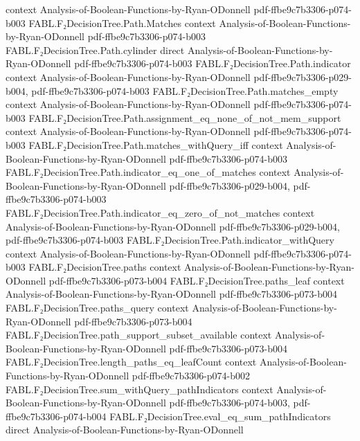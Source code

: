 \begin{theorem}
  {context}
  {Analysis-of-Boolean-Functions-by-Ryan-ODonnell}
  {pdf-ffbe9c7b3306-p074-b003}
\proofstep
  {FABL.F₂DecisionTree.Path.Matches}
  {context}
  {Analysis-of-Boolean-Functions-by-Ryan-ODonnell}
  {pdf-ffbe9c7b3306-p074-b003}
\proofstep
  {FABL.F₂DecisionTree.Path.cylinder}
  {direct}
  {Analysis-of-Boolean-Functions-by-Ryan-ODonnell}
  {pdf-ffbe9c7b3306-p074-b003}
\proofstep
  {FABL.F₂DecisionTree.Path.indicator}
  {context}
  {Analysis-of-Boolean-Functions-by-Ryan-ODonnell}
  {pdf-ffbe9c7b3306-p029-b004,
    pdf-ffbe9c7b3306-p074-b003}
\proofstep
  {FABL.F₂DecisionTree.Path.matches_empty}
  {context}
  {Analysis-of-Boolean-Functions-by-Ryan-ODonnell}
  {pdf-ffbe9c7b3306-p074-b003}
\proofstep
  {FABL.F₂DecisionTree.Path.assignment_eq_none_of_not_mem_support}
  {context}
  {Analysis-of-Boolean-Functions-by-Ryan-ODonnell}
  {pdf-ffbe9c7b3306-p074-b003}
\proofstep
  {FABL.F₂DecisionTree.Path.matches_withQuery_iff}
  {context}
  {Analysis-of-Boolean-Functions-by-Ryan-ODonnell}
  {pdf-ffbe9c7b3306-p074-b003}
\proofstep
  {FABL.F₂DecisionTree.Path.indicator_eq_one_of_matches}
  {context}
  {Analysis-of-Boolean-Functions-by-Ryan-ODonnell}
  {pdf-ffbe9c7b3306-p029-b004,
    pdf-ffbe9c7b3306-p074-b003}
\proofstep
  {FABL.F₂DecisionTree.Path.indicator_eq_zero_of_not_matches}
  {context}
  {Analysis-of-Boolean-Functions-by-Ryan-ODonnell}
  {pdf-ffbe9c7b3306-p029-b004,
    pdf-ffbe9c7b3306-p074-b003}
\proofstep
  {FABL.F₂DecisionTree.Path.indicator_withQuery}
  {context}
  {Analysis-of-Boolean-Functions-by-Ryan-ODonnell}
  {pdf-ffbe9c7b3306-p074-b003}
\proofstep
  {FABL.F₂DecisionTree.paths}
  {context}
  {Analysis-of-Boolean-Functions-by-Ryan-ODonnell}
  {pdf-ffbe9c7b3306-p073-b004}
\proofstep
  {FABL.F₂DecisionTree.paths_leaf}
  {context}
  {Analysis-of-Boolean-Functions-by-Ryan-ODonnell}
  {pdf-ffbe9c7b3306-p073-b004}
\proofstep
  {FABL.F₂DecisionTree.paths_query}
  {context}
  {Analysis-of-Boolean-Functions-by-Ryan-ODonnell}
  {pdf-ffbe9c7b3306-p073-b004}
\proofstep
  {FABL.F₂DecisionTree.path_support_subset_available}
  {context}
  {Analysis-of-Boolean-Functions-by-Ryan-ODonnell}
  {pdf-ffbe9c7b3306-p073-b004}
\proofstep
  {FABL.F₂DecisionTree.length_paths_eq_leafCount}
  {context}
  {Analysis-of-Boolean-Functions-by-Ryan-ODonnell}
  {pdf-ffbe9c7b3306-p074-b002}
\proofstep
  {FABL.F₂DecisionTree.sum_withQuery_pathIndicators}
  {context}
  {Analysis-of-Boolean-Functions-by-Ryan-ODonnell}
  {pdf-ffbe9c7b3306-p074-b003,
    pdf-ffbe9c7b3306-p074-b004}
\proofstep
  {FABL.F₂DecisionTree.eval_eq_sum_pathIndicators}
  {direct}
  {Analysis-of-Boolean-Functions-by-Ryan-ODonnell}

\end{theorem}
